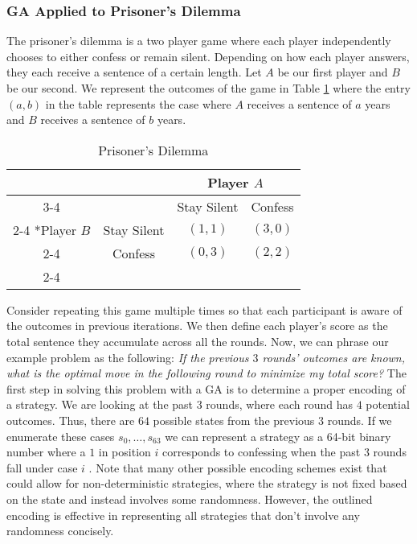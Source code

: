 \documentclass[11pt]{amsart}
\theoremstyle{definition}                  %
\theoremstyle{remark}                       %
\numberwithin{equation}{section}
\begin{document}
\subsubsection{GA Applied to Prisoner's Dilemma}
The prisoner's dilemma is a two player game where each player independently chooses to either confess or remain silent. Depending on how each player answers, they each receive a sentence of a certain length. Let $A$ be our first player and $B$ be our second. We represent the outcomes of the game in Table \ref{tab:PD} where the entry $(a, b)$ in the table represents the case where $A$ receives a sentence of $a$ years and $B$ receives a sentence of $b$ years. 
\begin{table}[h]
\begin{center}

    \setlength{\extrarowheight}{2pt}
    \begin{tabular}{*{4}{c|}}
      \multicolumn{2}{c}{} & \multicolumn{2}{c}{Player $A$}\\\cline{3-4}
      \multicolumn{1}{c}{} &  & Stay Silent  & Confess \\\cline{2-4}
      \multirow{2}*{Player $B$}  & Stay Silent & $(1,1)$ & $(3,0)$ \\\cline{2-4}
      & Confess & $(0,3)$ & $(2,2)$ \\\cline{2-4}
    \end{tabular}
    \end{center}
    \caption{\label{tab:PD} Prisoner's Dilemma}
\end{table}

Consider repeating this game multiple times so that each participant is aware of the outcomes in previous iterations. We then define each player's score as the total sentence they accumulate across all the rounds. Now, we can phrase our example problem as the following:
\textit{If the previous $3$ rounds' outcomes are known, what is the optimal move in the following round to minimize my total score?}
The first step in solving this problem with a GA is to determine a proper encoding of a strategy. We are looking at the past $3$ rounds, where each round has $4$ potential outcomes. Thus, there are $64$ possible states from the previous $3$ rounds. If we enumerate these cases $s_0, \ldots, s_{63}$ we can represent a strategy as a 64-bit binary number where a $1$ in position $i$ corresponds to confessing when the past $3$ rounds fall under case $i$ \cite{holland1992}. Note that many other possible encoding schemes exist that could allow for non-deterministic strategies, where the strategy is not fixed based on the state and instead involves some randomness. However, the outlined encoding is effective in representing all strategies that don't involve any randomness concisely. 
\end{document}
